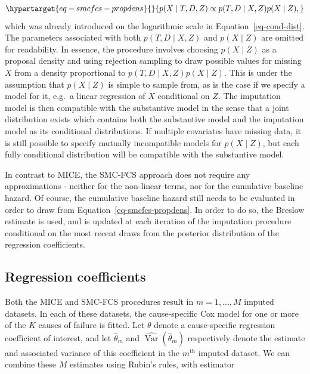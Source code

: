 \documentclass[
  letterpaper,
  DIV=11,
  numbers=noendperiod]{scrreprt}
\DeclareMathOperator{\Var}{Var}
\begin{document}
\begin{equation}\protect\hypertarget{eq-smcfcs-propdens}{}{
  p(X \mid T, D, Z) \propto p(T,D \mid X, Z)p(X \mid Z),
}\label{eq-smcfcs-propdens}\end{equation} which was already introduced
on the logarithmic scale in Equation~\ref{eq-cond-dist}. The parameters
associated with both \(p(T,D \mid X, Z)\) and \(p(X \mid Z)\) are
omitted for readability. In essence, the procedure involves choosing
\(p(X \mid Z)\) as a proposal density and using rejection sampling to
draw possible values for missing \(X\) from a density proportional to
\(p(T,D \mid X, Z)p(X \mid Z)\). This is under the assumption that
\(p(X \mid Z)\) is simple to sample from, as is the case if we specify a
model for it, e.g.~a linear regression of \(X\) conditional on \(Z\).
The imputation model is then compatible with the substantive model in
the sense that a joint distribution exists which contains both the
substantive model and the imputation model as its conditional
distributions. If multiple covariates have missing data, it is still
possible to specify mutually incompatible models for \(p(X \mid Z)\),
but each fully conditional distribution will be compatible with the
substantive model.

In contrast to MICE, the SMC-FCS approach does not require any
approximations - neither for the non-linear terms, nor for the
cumulative baseline hazard. Of course, the cumulative baseline hazard
still needs to be evaluated in order to draw from
Equation~\ref{eq-smcfcs-propdens}. In order to do so, the Breslow
estimate is used, and is updated at each iteration of the imputation
procedure conditional on the most recent draws from the posterior
distribution of the regression coefficients.

\hypertarget{regression-coefficients}{%
\subsection{Regression coefficients}\label{regression-coefficients}}

Both the MICE and SMC-FCS procedures result in \(m = 1,...,M\) imputed
datasets. In each of these datasets, the cause-specific Cox model for
one or more of the \(K\) causes of failure is fitted. Let \(\theta\)
denote a cause-specific regression coefficient of interest, and let
\(\hat{\theta}_m\) and \(\widehat{\Var}(\hat{\theta}_m)\) respectively
denote the estimate and associated variance of this coefficient in the
\(m^{\text{th}}\) imputed dataset. We can combine these \(M\) estimates
using Rubin's rules, with estimator
\end{document}
